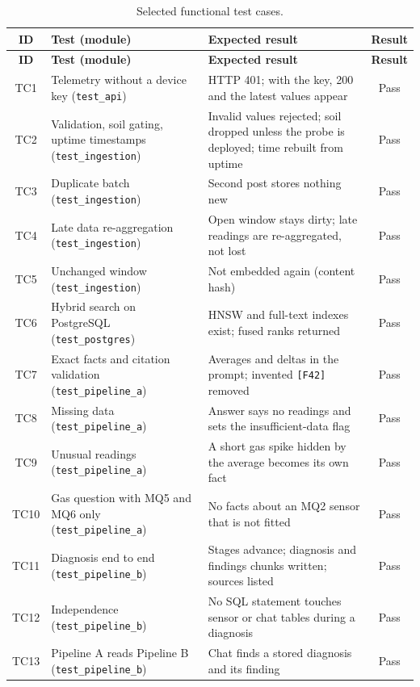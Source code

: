 {\footnotesize
\begin{longtable}{|c|P{4.3cm}|P{5.7cm}|c|}
\caption{Selected functional test cases.}\label{tab:testcases}\\
\hline
\textbf{ID} & \textbf{Test (module)} & \textbf{Expected result} & \textbf{Result}\\\hline
\endfirsthead
\hline
\textbf{ID} & \textbf{Test (module)} & \textbf{Expected result} & \textbf{Result}\\\hline
\endhead
TC1 & Telemetry without a device key (\texttt{test\_api}) & HTTP 401; with the key, 200 and the latest values appear & Pass\\\hline
TC2 & Validation, soil gating, uptime timestamps (\texttt{test\_ingestion}) & Invalid values rejected; soil dropped unless the probe is deployed; time rebuilt from uptime & Pass\\\hline
TC3 & Duplicate batch (\texttt{test\_ingestion}) & Second post stores nothing new & Pass\\\hline
TC4 & Late data re-aggregation (\texttt{test\_ingestion}) & Open window stays dirty; late readings are re-aggregated, not lost & Pass\\\hline
TC5 & Unchanged window (\texttt{test\_ingestion}) & Not embedded again (content hash) & Pass\\\hline
TC6 & Hybrid search on PostgreSQL (\texttt{test\_postgres}) & HNSW and full-text indexes exist; fused ranks returned & Pass\\\hline
TC7 & Exact facts and citation validation (\texttt{test\_pipeline\_a}) & Averages and deltas in the prompt; invented \texttt{[F42]} removed & Pass\\\hline
TC8 & Missing data (\texttt{test\_pipeline\_a}) & Answer says no readings and sets the insufficient-data flag & Pass\\\hline
TC9 & Unusual readings (\texttt{test\_pipeline\_a}) & A short gas spike hidden by the average becomes its own fact & Pass\\\hline
TC10 & Gas question with MQ5 and MQ6 only (\texttt{test\_pipeline\_a}) & No facts about an MQ2 sensor that is not fitted & Pass\\\hline
TC11 & Diagnosis end to end (\texttt{test\_pipeline\_b}) & Stages advance; diagnosis and findings chunks written; sources listed & Pass\\\hline
TC12 & Independence (\texttt{test\_pipeline\_b}) & No SQL statement touches sensor or chat tables during a diagnosis & Pass\\\hline
TC13 & Pipeline A reads Pipeline B (\texttt{test\_pipeline\_b}) & Chat finds a stored diagnosis and its finding & Pass\\\hline

\end{longtable}}
